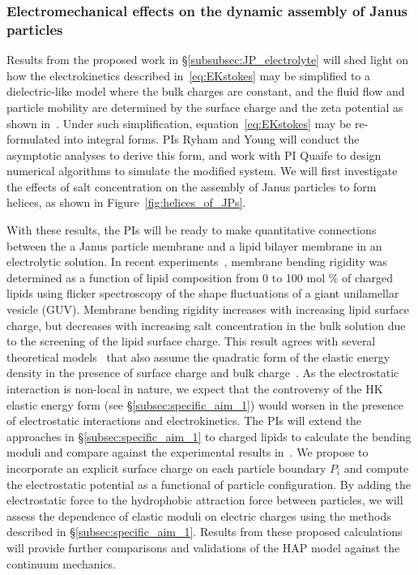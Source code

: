 \subsubsection{Electromechanical effects on the dynamic assembly of Janus particles \label{subsubsec:em_effects}}
Results from the proposed work in \S\ref{subsubsec:JP_electrolyte} will
shed light on how the electrokinetics described in~\eqref{eq:EKstokes}
may be simplified to a dielectric-like model where the bulk charges are
constant, and the fluid flow and particle mobility are determined by the
surface charge and the zeta potential as shown in~\cite{Mori2018_JFM}.
Under such simplification, equation~\eqref{eq:EKstokes} may be
re-formulated into integral forms. PIs Ryham and Young will conduct the
asymptotic analyses to derive this form, and work with PI Quaife to
design numerical algorithms to simulate the modified system. We will
first investigate the effects of salt concentration on the assembly of
Janus particles to form helices, as shown in
Figure~\ref{fig:helices_of_JPs}.

With these results, the PIs will be ready to make quantitative
connections between the a Janus particle membrane and a lipid bilayer
membrane in an electrolytic solution. In recent
experiments~\cite{FaizEtAl2019_SoftMatt}, membrane bending rigidity was
determined as a function of lipid composition from 0 to 100 mol $\%$ of
charged lipids using flicker spectroscopy of the shape fluctuations of a
giant unilamellar vesicle (GUV). Membrane bending rigidity increases
with increasing lipid surface charge, but decreases with increasing salt
concentration in the bulk solution due to the screening of the lipid
surface charge. This result agrees with several theoretical
models~\cite{Kralchevsky1996_JCIS, May1996_JChemPhys,
LoubetEtAl2013_PRE} that also assume the quadratic form of the elastic
energy density in the presence of surface charge and bulk
charge~\cite{DuplantierGoldstein1990_PRL, Winterhalter1992_JPC}. As the
electrostatic interaction is non-local in nature, we expect that the
controversy of the HK elastic energy form (see
\S\ref{subsec:specific_aim_1}) would worsen in the presence of
electrostatic interactions and electrokinetics. The PIs will extend the
approaches in \S\ref{subsec:specific_aim_1} to charged lipids to
calculate the bending moduli and compare against the experimental
results in~\cite{FaizEtAl2019_SoftMatt}. We propose to incorporate an
explicit surface charge on each particle boundary $P_i$ and compute the
electrostatic potential as a functional of particle configuration.  By
adding the electrostatic force to the hydrophobic attraction force
between particles, we will assess the dependence of elastic moduli on
electric charges using the methods described in
\S\ref{subsec:specific_aim_1}. Results from these proposed calculations
will provide further comparisons and validations of the HAP model
against the continuum mechanics.

